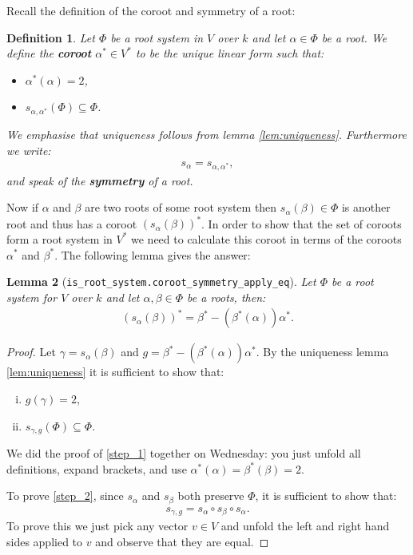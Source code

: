 \documentclass[12pt, a4paper]{article}
\newtheorem{lemma}{Lemma}[section]
\newtheorem{definition}[lemma]{Definition}
\begin{document}
Recall the definition of the coroot and symmetry of a root:
\begin{definition}
  Let $\Phi$ be a root system in $V$ over $k$ and let $\alpha \in \Phi$ be a root. We define the
  \textbf{coroot} $\alpha^* \in V^*$ to be the unique linear form such that:
  \begin{itemize}
    \item $\alpha^*(\alpha) = 2$,
    \item $s_{\alpha, \alpha^*}(\Phi) \subseteq \Phi$.
  \end{itemize}
  We emphasise that uniqueness follows from lemma \ref{lem:uniqueness}. Furthermore we write:
  \begin{align*}
    s_\alpha = s_{\alpha, \alpha^*},
  \end{align*}
  and speak of the \textbf{symmetry} of a root.
\end{definition}

Now if $\alpha$ and $\beta$ are two roots of some root system then $s_\alpha(\beta) \in \Phi$
is another root and thus has a coroot $(s_\alpha(\beta))^*$. In order to show that the set of
coroots form a root system in $V^*$ we need to calculate this coroot in terms of the coroots
$\alpha^*$ and $\beta^*$. The following lemma gives the answer:
\begin{lemma}[\texttt{is\_root\_system.coroot\_symmetry\_apply\_eq}]\label{coroot_symmetry_apply_eq}
  Let $\Phi$ be a root system for $V$ over $k$ and let $\alpha, \beta \in \Phi$ be a roots, then:
  \begin{align*}
    (s_\alpha(\beta))^* = \beta^* - (\beta^*(\alpha))\alpha^*.
  \end{align*}
\end{lemma}
\begin{proof}
  Let $\gamma = s_\alpha(\beta)$ and $g = \beta^* - (\beta^*(\alpha))\alpha^*$.
  By the uniqueness lemma \ref{lem:uniqueness} it is sufficient to show that:
  \begin{enumerate}[(i)]
    \item $g(\gamma) = 2$\label{step_1},
    \item $s_{\gamma, g}(\Phi) \subseteq \Phi$\label{step_2}.
  \end{enumerate}
  We did the proof of \eqref{step_1} together on Wednesday: you just unfold all definitions,
  expand brackets, and use $\alpha^*(\alpha) = \beta^*(\beta) = 2$.

  To prove \eqref{step_2}, since $s_\alpha$ and $s_\beta$ both preserve $\Phi$, it is sufficient to
  show that:
  \begin{align*}
    s_{\gamma, g} = s_\alpha \circ s_\beta \circ s_\alpha .
  \end{align*}
  To prove this we just pick any vector $v \in V$ and unfold the left and right hand sides applied
  to $v$ and observe that they are equal.
\end{proof}
\end{document}
